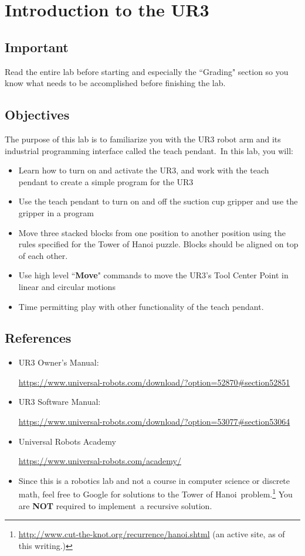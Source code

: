 \chapter{Introduction to the UR3}
\section{Important}
Read the entire lab before starting and especially the ``Grading" section so you know what needs to be accomplished before finishing the lab.
\section{Objectives}
The purpose of this lab is to familiarize you with the UR3 robot arm and its industrial programming interface called the teach pendant.\
In this lab, you will:
\begin{itemize}
\item Learn how to turn on and activate the UR3, and work with the teach pendant to create a simple program for the UR3
\item Use the teach pendant to turn on and off the suction cup gripper and use the gripper in a program
\item Move three stacked blocks from one position to another position using the rules specified for the Tower of Hanoi puzzle.  Blocks should be aligned on top
of each other.
\item Use high level ``\textbf{Move}" commands to move the UR3's Tool Center Point in linear and circular motions
\item Time permitting play with other functionality of the teach pendant.
\end{itemize}

\section{References}
\begin{itemize}
\item UR3 Owner's Manual:

\url{https://www.universal-robots.com/download/?option=52870#section52851}
\item UR3 Software Manual:

\url{https://www.universal-robots.com/download/?option=53077#section53064}
\item Universal Robots Academy

\url{https://www.universal-robots.com/academy/}

\item Since this is a robotics lab and not a course in computer science or discrete math, feel free to Google for solutions to the Tower of Hanoi\
problem.\footnote{\url{http://www.cut-the-knot.org/recurrence/hanoi.shtml} (an active site, as of this writing.)} You are \textbf{NOT} required to implement\
a recursive solution.
\end{itemize}

